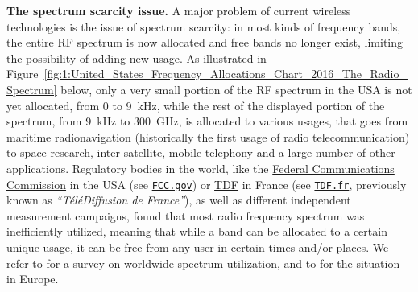 \textbf{The spectrum scarcity issue.}
%
A major problem of current wireless technologies is the issue of spectrum scarcity:
in most kinds of frequency bands, the entire RF spectrum is now allocated and free bands no longer exist, limiting the possibility of adding new usage.
As illustrated in Figure~\ref{fig:1:United_States_Frequency_Allocations_Chart_2016_The_Radio_Spectrum} below, only a very small portion of the RF spectrum in the USA is not yet allocated, from $0$ to \SI{9}{\kilo\hertz}, while the rest of the displayed portion of the spectrum, from \SI{9}{\kilo\hertz} to \SI{300}{\giga\hertz}, is allocated to various usages, that goes from maritime radionavigation (historically the first usage of radio telecommunication) to space research, inter-satellite, mobile telephony and a large number of other applications.
%
Regulatory bodies in the world, like the \href{https://www.fcc.gov/}{Federal Communications Commission} in the USA (see \href{https://www.fcc.gov/}{\texttt{FCC.gov}})
or \href{http://www.tdf.fr/}{TDF} in France (see \href{https://www.TDF.fr/}{\texttt{TDF.fr}}, previously known as \emph{``TéléDiffusion de France''}), as well as different independent measurement campaigns, found that most radio frequency spectrum was inefficiently utilized,
meaning that while a band can be allocated to a certain unique usage, it can be free from any user in certain times and/or places.
We refer to \cite{patil2011survey} for a survey on worldwide spectrum utilization, and to \cite{valenta2010survey} for the situation in Europe.


